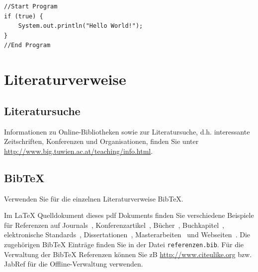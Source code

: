 \documentclass[deutsch]{llncs}
\begin{document}
\begin{minipage}{\linewidth} 
\lstset{%
  basicstyle=\sffamily,
  keywordstyle=\bfseries,
  columns=fixed,
  showstringspaces=false,
  language=Java
}  
\begin{lstlisting}[caption={Hello world}, label=lst:hello, captionpos=b]
//Start Program
if (true) {
    System.out.println("Hello World!");
}
//End Program
\end{lstlisting}
\end{minipage}

\section{Literaturverweise}
\label{sec:bib}

\subsection{Literatursuche}
\label{subsec:search}

Informationen zu Online-Bibliotheken sowie zur Literatursuche, d.h. interessante Zeitschriften, Konferenzen und Organisationen, finden Sie unter \url{http://www.big.tuwien.ac.at/teaching/info.html}.

\subsection{BibTeX}
\label{subsec:bibtex}
Verwenden Sie für die einzelnen Literaturverweise BibTeX.

Im LaTeX Quelldokument dieses pdf Dokuments finden Sie verschiedene Beispiele für Referenzen auf Journals~\cite{jour:B2BServices}, Konferenzartikel~\cite{proc:TheWebMLApproach}, Bücher~\cite{book:umlatwork}, Buchkapitel~\cite{incoll:ErhardKonrad1992}, elektronische Standards~\cite{man:BPEL}, Dissertationen~\cite{phdthesis:manuelWimmer}, Masterarbeiten~\cite{mast:AUMLProfile} und Webseiten~\cite{misc:BIGWebsite}. Die zugehörigen BibTeX Einträge finden Sie in der Datei \texttt{referenzen.bib}. Für die Verwaltung der BibTeX Referenzen können Sie zB \url{http://www.citeulike.org} bzw. JabRef für die Offline-Verwaltung verwenden.

\printbibliography
\end{document}
